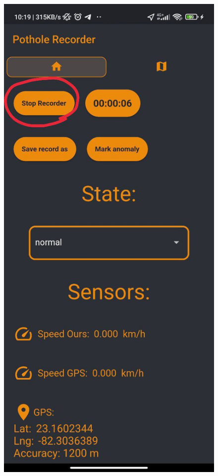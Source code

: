 	\begin{figure}[htb]
		\centering
		\includegraphics[scale = 0.175]{Graphics/apk_stop_recording.jpg}

\end{figure}
